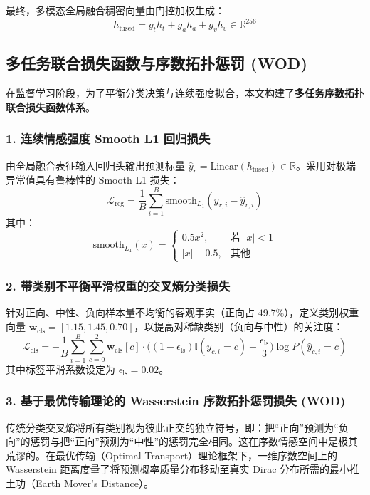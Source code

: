 最终，多模态全局融合稠密向量由门控加权生成：
\begin{equation}
h_{\text{fused}} = g_t \bar{h}_t + g_a \bar{h}_a + g_v \bar{h}_v \in \mathbb{R}^{256}
\end{equation}

\subsection{多任务联合损失函数与序数拓扑惩罚 (WOD)}
在监督学习阶段，为了平衡分类决策与连续强度拟合，本文构建了\textbf{多任务序数拓扑联合损失函数体系}。

\subsubsection{1. 连续情感强度 Smooth L1 回归损失}
由全局融合表征输入回归头输出预测标量 $\hat{y}_r = \text{Linear}(h_{\text{fused}}) \in \mathbb{R}$。采用对极端异常值具有鲁棒性的 Smooth L1 损失：
\begin{equation}
\mathcal{L}_{\text{reg}} = \frac{1}{B} \sum_{i=1}^B \text{smooth}_{L_1}(y_{r,i} - \hat{y}_{r,i})
\end{equation}
其中：
\begin{equation}
\text{smooth}_{L_1}(x) = \begin{cases}
0.5 x^2, & \text{若 } |x| < 1 \\
|x| - 0.5, & \text{其他}
\end{cases}
\end{equation}

\subsubsection{2. 带类别不平衡平滑权重的交叉熵分类损失}
针对正向、中性、负向样本量不均衡的客观事实（正向占 $49.7\%$），定义类别权重向量 $\mathbf{w}_{\text{cls}} = [1.15, 1.45, 0.70]$，以提高对稀缺类别（负向与中性）的关注度：
\begin{equation}
\mathcal{L}_{\text{cls}} = -\frac{1}{B} \sum_{i=1}^B \sum_{c=0}^2 \mathbf{w}_{\text{cls}}[c] \cdot \big((1 - \epsilon_{\text{ls}}) \mathbb{I}(y_{c,i} = c) + \frac{\epsilon_{\text{ls}}}{3}\big) \log P(\hat{y}_{c,i} = c)
\end{equation}
其中标签平滑系数设定为 $\epsilon_{\text{ls}} = 0.02$。

\subsubsection{3. 基于最优传输理论的 Wasserstein 序数拓扑惩罚损失 (WOD)}
传统分类交叉熵将所有类别视为彼此正交的独立符号，即：把“正向”预测为“负向”的惩罚与把“正向”预测为“中性”的惩罚完全相同。这在序数情感空间中是极其荒谬的。在最优传输（Optimal Transport）理论框架下，一维序数空间上的 Wasserstein 距离度量了将预测概率质量分布移动至真实 Dirac 分布所需的最小推土功（Earth Mover's Distance）。

